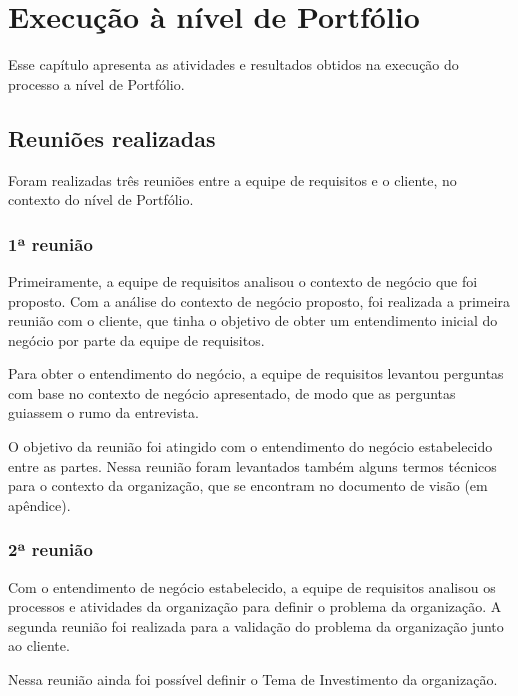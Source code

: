 \chapter{Execução à nível de Portfólio}
  
  Esse capítulo apresenta as atividades e resultados obtidos na execução do processo a nível de Portfólio.
  
  \section{Reuniões realizadas}
    
    Foram realizadas três reuniões entre a equipe de requisitos e o cliente, no contexto do nível de Portfólio. 
    
    \subsection{1ª reunião}
      
      Primeiramente, a equipe de requisitos analisou o contexto de negócio que foi proposto.
      Com a análise do contexto de negócio proposto, foi realizada a primeira reunião com o cliente, que tinha o objetivo de 
      obter um entendimento inicial do negócio por parte da equipe de requisitos. 
      
      Para obter o entendimento do negócio, a equipe de requisitos levantou perguntas com base no contexto de negócio apresentado, 
      de modo que as perguntas guiassem o rumo da entrevista.
      
      O objetivo da reunião foi atingido com o entendimento do negócio estabelecido entre as partes. Nessa reunião 
      foram levantados também alguns termos técnicos para o contexto da organização, que se encontram no documento de visão
      (em apêndice).
      
    \subsection{2ª reunião}
    
      Com o entendimento de negócio estabelecido, a equipe de requisitos analisou os processos e atividades da 
      organização para definir o problema da organização. A segunda reunião foi realizada para a validação do problema 
      da organização junto ao cliente.
      
      Nessa reunião ainda foi possível definir o Tema de Investimento da organização.
    
